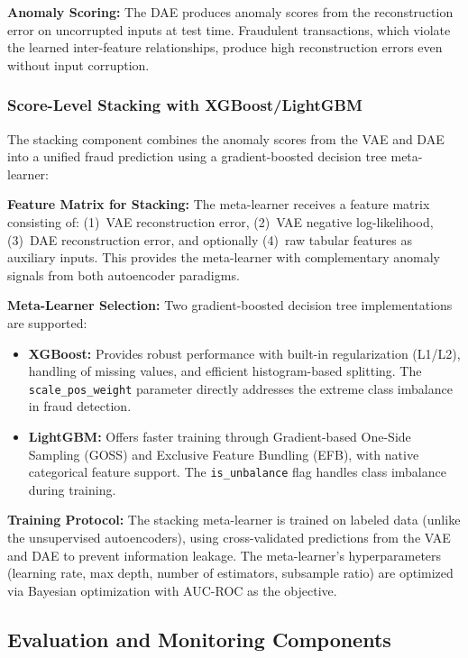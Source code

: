 \textbf{Anomaly Scoring:} The DAE produces anomaly scores from the reconstruction error on uncorrupted inputs at test time. Fraudulent transactions, which violate the learned inter-feature relationships, produce high reconstruction errors even without input corruption.

\subsubsection{Score-Level Stacking with XGBoost/LightGBM}

The stacking component combines the anomaly scores from the VAE and DAE into a unified fraud prediction using a gradient-boosted decision tree meta-learner:

\textbf{Feature Matrix for Stacking:} The meta-learner receives a feature matrix consisting of: (1)~VAE reconstruction error, (2)~VAE negative log-likelihood, (3)~DAE reconstruction error, and optionally (4)~raw tabular features as auxiliary inputs. This provides the meta-learner with complementary anomaly signals from both autoencoder paradigms.

\textbf{Meta-Learner Selection:} Two gradient-boosted decision tree implementations are supported:
\begin{itemize}
\item \textbf{XGBoost:} Provides robust performance with built-in regularization (L1/L2), handling of missing values, and efficient histogram-based splitting. The \texttt{scale\_pos\_weight} parameter directly addresses the extreme class imbalance in fraud detection.
\item \textbf{LightGBM:} Offers faster training through Gradient-based One-Side Sampling (GOSS) and Exclusive Feature Bundling (EFB), with native categorical feature support. The \texttt{is\_unbalance} flag handles class imbalance during training.
\end{itemize}

\textbf{Training Protocol:} The stacking meta-learner is trained on labeled data (unlike the unsupervised autoencoders), using cross-validated predictions from the VAE and DAE to prevent information leakage. The meta-learner's hyperparameters (learning rate, max depth, number of estimators, subsample ratio) are optimized via Bayesian optimization with AUC-ROC as the objective.

\subsection{Evaluation and Monitoring Components}

